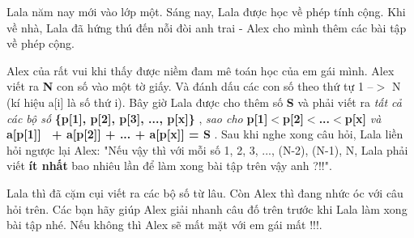 Lala năm nay mới vào lớp một. Sáng nay, Lala được học về phép tính cộng. Khi về nhà, Lala đã hứng thú đến nỗi đòi anh trai - Alex cho mình thêm các bài tập về phép cộng.  

   Alex của rất vui khi thấy được niềm đam mê toán học của em gái mình. Alex viết ra   \textbf{    N   }   con số vào một tờ giấy. Và đánh dấu các con số theo thứ tự 1 --$>$ N (kí hiệu a[i] là số thứ i). Bây giờ Lala được cho thêm số   \textbf{    S   }   và phải viết ra   \emph{    tất cả các bộ số   }\textbf{    \{p[1], p[2], p[3], ..., p[x]\}   }   ,   \emph{    sao cho   }\textbf{\emph{}    p[1]$<$p[2]$<$...$<$p[x]   }\emph{    và   }\textbf{    a[p[1]]  + a[p[2]] + ... + a[p[x]] = S   }   . Sau khi nghe xong câu hỏi, Lala liền hỏi ngược lại Alex: "Nếu vậy thì với mỗi số 1, 2, 3, ..., (N-2), (N-1), N, Lala phải viết   \textbf{    ít nhất   }   bao nhiêu lần để làm xong bài tập trên vậy anh ?!!".  

   Lala thì đã cặm cụi viết ra các bộ số từ lâu. Còn Alex thì đang nhức óc với câu hỏi trên. Các bạn hãy giúp Alex giải nhanh câu đố trên trước khi Lala làm xong bài tập nhé. Nếu không thì Alex sẽ mất mặt với em gái mất !!!.